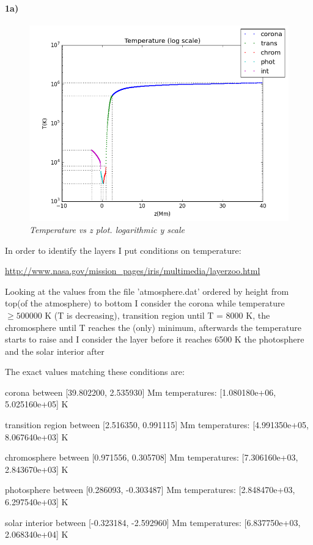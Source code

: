 \documentclass[10pt]{book}
\begin{document}
\paragraph {1a)} 
\begin{figure}[H]
 \centering
 \includegraphics[scale=0.5]{tempLayers.png}
 \caption{\emph{Temperature vs z plot. logarithmic y scale}}
\end{figure}

In order to identify the layers I put conditions on temperature:

\url{http://www.nasa.gov/mission_pages/iris/multimedia/layerzoo.html}

Looking at  the values from the  file 'atmosphere.dat' ordered by height from top(of the atmosphere) 
to bottom I consider the corona while temperature $\ge 500000$ K (T is decreasing), 
transition region until T = 8000 K, the chromosphere until T reaches the (only) minimum, afterwards the temperature starts to raise
and I consider the layer before it reaches 6500 K the photosphere and  the solar interior after

The exact values matching these conditions are: 
\begin{description}

\item corona between [39.802200, 2.535930] Mm temperatures: [1.080180e+06, 5.025160e+05] K 
\item transition region between [2.516350, 0.991115] Mm temperatures: [4.991350e+05, 8.067640e+03] K  
\item chromosphere between [0.971556, 0.305708] Mm temperatures: [7.306160e+03, 2.843670e+03] K 
\item photosphere between [0.286093, -0.303487] Mm temperatures: [2.848470e+03, 6.297540e+03] K 
\item solar interior between [-0.323184, -2.592960] Mm temperatures: [6.837750e+03, 2.068340e+04] K 

\end{description}
\end{document}
